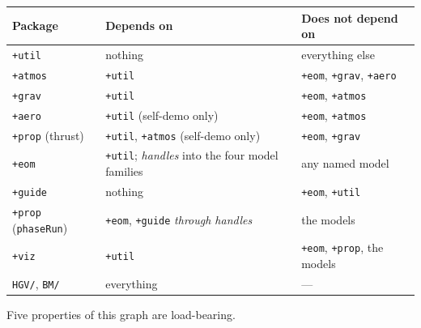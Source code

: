 \documentclass[11pt]{article}
\newcommand{\code}[1]{\texttt{#1}}
\newcommand{\pkg}[1]{\texttt{+#1}}
\begin{document}
\begin{center}
\begin{tabular}{lll}
\toprule
Package & Depends on & Does \textbf{not} depend on \\
\midrule
\pkg{util}   & nothing                       & everything else \\
\pkg{atmos}  & \pkg{util}                    & \pkg{eom}, \pkg{grav}, \pkg{aero} \\
\pkg{grav}   & \pkg{util}                    & \pkg{eom}, \pkg{atmos} \\
\pkg{aero}   & \pkg{util} (self-demo only)   & \pkg{eom}, \pkg{atmos} \\
\pkg{prop} (thrust) & \pkg{util}, \pkg{atmos} (self-demo only) & \pkg{eom}, \pkg{grav} \\
\pkg{eom}    & \pkg{util}; \emph{handles} into the four model families & any named model \\
\pkg{guide}  & nothing                       & \pkg{eom}, \pkg{util} \\
\pkg{prop} (\code{phaseRun}) & \pkg{eom}, \pkg{guide} \emph{through handles} & the models \\
\pkg{viz}    & \pkg{util}                    & \pkg{eom}, \pkg{prop}, the models \\
\code{HGV/}, \code{BM/} & everything          & --- \\
\bottomrule
\end{tabular}
\end{center}

Five properties of this graph are load-bearing.
\end{document}
